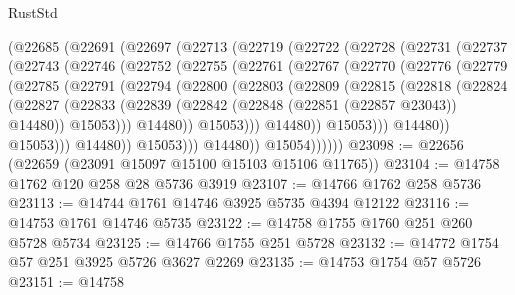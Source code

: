 \begin{lexlean}{RustStd}
\begin{coremodule}
      (@22685
        (@22691
          (@22697
            (@22713
              (@22719
                (@22722
                  (@22728
                    (@22731
                      (@22737
                        (@22743
                          (@22746
                            (@22752
                              (@22755
                                (@22761
                                  (@22767
                                    (@22770
                                      (@22776
                                        (@22779
                                          (@22785
                                            (@22791
                                              (@22794
                                                (@22800
                                                  (@22803
                                                    (@22809
                                                      (@22815
                                                        (@22818
                                                          (@22824
                                                            (@22827
                                                              (@22833
                                                                (@22839
                                                                  (@22842
                                                                    (@22848
                                                                      (@22851 (@22857 @23043))
                                                                      @14480))
                                                                  @15053)))
                                                            @14480))
                                                        @15053)))
                                                  @14480))
                                              @15053)))
                                        @14480))
                                    @15053)))
                              @14480))
                          @15053)))
                    @14480))
                @15054))))))
@23098 := @22656 (@22659 (@23091 @15097 @15100 @15103 @15106 @11765))
@23104 := @14758 @1762 @120 @258 @28 @5736 @3919
@23107 := @14766 @1762 @258 @5736
@23113 := @14744 @1761 @14746 @3925 @5735 @4394 @12122
@23116 := @14753 @1761 @14746 @5735
@23122 := @14758 @1755 @1760 @251 @260 @5728 @5734
@23125 := @14766 @1755 @251 @5728
@23132 := @14772 @1754 @57 @251 @3925 @5726 @3627 @2269
@23135 := @14753 @1754 @57 @5726
@23151 := @14758

\end{coremodule}
\end{lexlean}
